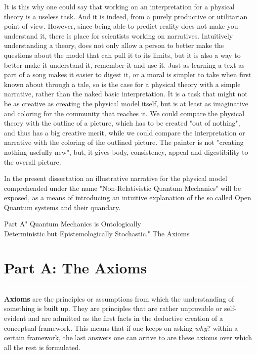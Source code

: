 \documentclass[11pt, a4paper]{article} %
\begin{document}
It is this why one could say that working on an interpretation for a physical theory is a useless task. And it is indeed, from a purely productive or utilitarian point of view. However, since being able to predict reality does not make you understand it, there is place for scientists working on narratives. Intuitively understanding a theory, does not only allow a person to better make the questions about the model that can pull it to its limits, but it is also a way to better make it understand it, remember it and use it. Just as learning a text as part of a song makes it easier to digest it, or a moral is simpler to take when first known about through a tale, so is the case for a physical theory with a simple narrative, rather than the naked basic interpretation. It is a task that might not be as creative as creating the physical model itself, but is at least as imaginative and coloring for the community that reaches it. We could compare the physical theory with the outline of a picture, which has to be created "out of nothing", and thus has a big creative merit, while we could compare the interpretation or narrative with the coloring of the outlined picture. The painter is not "creating nothing usefully new", but, it gives body, consistency, appeal and digestibility to the overall picture.

In the present dissertation an illustrative narrative for the physical model comprehended under the name "Non-Relativistic Quantum Mechanics" will be exposed, as a means of introducing an intuitive explanation of the so called Open Quantum systems and their quandary.




\newpage


\begin{kapituloBerria}{Part A}{" Quantum Mechanics is Ontologically\\ Deterministic but Epistemologically Stochastic."}
The Axioms 
\end{kapituloBerria}
\newpage
\fancyhead[L]{\null}
\fancyhead[R]{\null}
\null
\clearpage


\section*{\centering \huge{Part A: The Axioms}\vspace{-0.3cm}}
\noindent\rule{\textwidth}{0.4pt}

{\bf Axioms} are the principles or assumptions from which the understanding of something is built up. They are principles that are rather unprovable or self-evident and are admitted as the first facts in the deductive creation of a conceptual framework. This means that if one keeps on asking $why?$ within a certain framework, the last answers one can arrive to are these axioms over which all the rest is formulated. \vspace{0.2cm}
\end{document}
